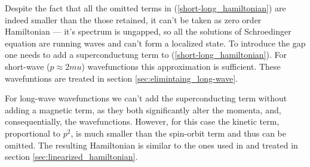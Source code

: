   Despite the fact that all the omitted terms in (\ref{short-long_hamiltonian}) are indeed smaller than the those retained, it can't be taken as zero order Hamiltonian --- it's spectrum is ungapped, so all the solutions of Schroedinger equation are running waves and can't form a localized state. To introduce the gap one needs to add a superconductung term to (\ref{short-long_hamiltonian}). For short-wave ($ p\approx2mu $) wavefunctions this approximation is sufficient. These wavefuntions are treated in section \ref{sec:elimintaing_long-wave}.
  
  For long-wave wavefunctions we can't add the superconducting term without adding a magnetic term, as they both significantly alter the momenta, and, consequentially, the wavefunctions. However, for this case the kinetic term, proportional to $ p^2 $, is much smaller than the spin-orbit term  and thus can be omitted. The resulting Hamiltonian is similar to the ones used in \cite{Oreg_2010,Lutchyn_2010} and treated in section \ref{sec:linearized_hamiltonian}. 
  

